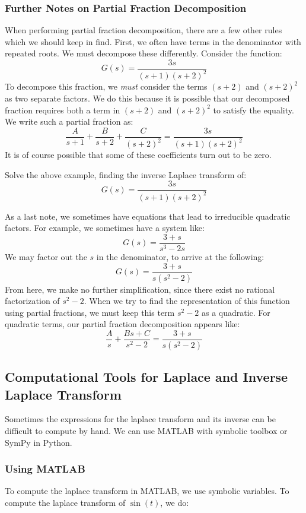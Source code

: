 \subsubsection{Further Notes on Partial Fraction Decomposition}
When performing partial fraction decomposition, there are a few other rules which we should keep in find. First, we often have terms in the denominator with repeated roots. We must decompose these differently. Consider the function:
$$G(s)=\frac{3s}{(s+1)(s+2)^2}$$
To decompose this fraction, we \textit{must} consider the terms $(s+2)$ and $(s+2)^2$ as two separate factors. We do this because it is possible that our decomposed fraction requires both a term in $(s+2)$ and $(s+2)^2$ to satisfy the equality. We write such a partial fraction as:
$$\frac{A}{s+1}+\frac{B}{s+2}+\frac{C}{(s+2)^2}=\frac{3s}{(s+1)(s+2)^2}$$
It is of course possible that some of these coefficients turn out to be zero.
\begin{exercise}
    Solve the above example, finding the inverse Laplace transform of:
    $$G(s)=\frac{3s}{(s+1)(s+2)^2}$$
\end{exercise}
As a last note, we sometimes have equations that lead to irreducible quadratic factors. For example, we sometimes have a system like:
$$G(s)=\frac{3+s}{s^3-2s}$$
We may factor out the $s$ in the denominator, to arrive at the following:
$$G(s)=\frac{3+s}{s(s^2-2)}$$
From here, we make no further simplification, since there exist no rational factorization of $s^2-2$. When we try to find the representation of this function using partial fractions, we must keep this term $s^2-2$ as a quadratic. For quadratic terms, our partial fraction decomposition appears like:
$$\frac{A}{s}+\frac{Bs+C}{s^2-2}=\frac{3+s}{s(s^2-2)}$$

\subsection{Computational Tools for Laplace and Inverse Laplace Transform}

Sometimes the expressions for the \gls{laplace transform} and its inverse can be difficult to compute by hand. We can use MATLAB with symbolic toolbox or SymPy in Python.

\subsubsection{Using MATLAB}
To compute the \gls{laplace transform} in MATLAB, we use symbolic variables. To compute the \gls{laplace transform} of $\sin(t)$, we do:

